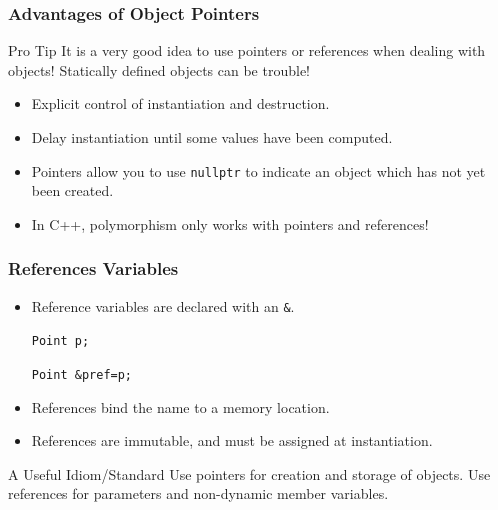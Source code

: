 \documentclass[handout]{beamer}
\begin{document}
\begin{frame}
    \frametitle{Advantages of Object Pointers}
    \begin{block}{Pro Tip}
        It is a very good idea to use pointers or references when
        dealing with objects!  Statically defined objects can be 
        trouble!
    \end{block}
    \begin{itemize}
        \item Explicit control of instantiation and destruction.
        \item Delay instantiation until some values have been computed.
        \item Pointers allow you to use {\tt nullptr} to indicate an
            object which has not yet been created.
        \item In C++, polymorphism only works with pointers and references!
    \end{itemize}
\end{frame}

\begin{frame}
    \frametitle{References Variables}
    \begin{itemize}
        \item Reference variables are declared with an {\tt \&}.
            \par{\tt Point p;}
            \par{\tt Point \&pref=p;}
        \item References bind the name to a memory location.
        \item References are immutable, and must be assigned at 
            instantiation.
    \end{itemize}
    \begin{block}{A Useful Idiom/Standard}
        Use pointers for creation and storage of objects.  Use
        references for parameters and non-dynamic member variables.
    \end{block}
\end{frame}
\end{document}

